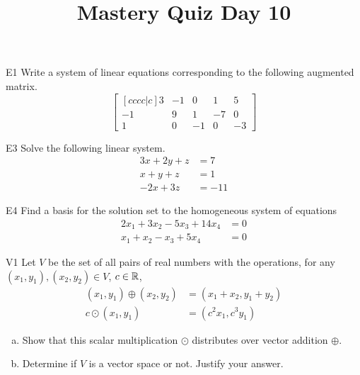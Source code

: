 \documentclass{sbgLAquiz}
\title{Mastery Quiz Day 10 }
\begin{document}
\begin{problem}{E1}
Write a system of linear equations corresponding to the following
augmented matrix.
\[
\begin{bmatrix}[cccc|c]
3 & -1 & 0 & 1 & 5 \\
-1 & 9 & 1 & -7 & 0 \\
1 & 0 & -1 & 0 & -3
\end{bmatrix}
\]
\end{problem}

\begin{problem}{E3}
Solve the following linear system.
\begin{align*}
3x+2y+z &= 7 \\
x+y+z &= 1 \\
-2x+3z &= -11
\end{align*}
\end{problem}
\newpage

\begin{problem}{E4}
Find a basis for the solution set to the homogeneous system of equations
\begin{align*}
2x_1+3x_2-5x_3+14x_4 &= 0\\
x_1+x_2-x_3+5x_4 &= 0
\end{align*}
\end{problem}

\begin{problem}{V1}
Let $V$ be the set of all pairs of real numbers with the operations, for any $(x_1,y_1), (x_2,y_2) \in V$, $c \in \mathbb{R}$,
\begin{align*}
(x_1,y_1) \oplus (x_2,y_2) &= (x_1+x_2,y_1+y_2) \\
c \odot (x_1,y_1) &= (c^2x_1, c^3y_1)
\end{align*}
\begin{enumerate}[(a)]
\item Show that this scalar multiplication $\odot$ distributes over vector addition $\oplus$.
\item Determine if $V$ is a vector space or not.  Justify your answer.
\end{enumerate}
\end{problem}
\end{document}
